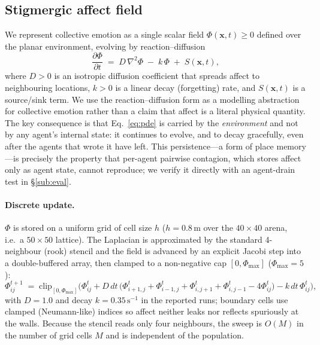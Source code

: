 \documentclass[sigconf,nonacm]{acmart}
\begin{document}
\subsection{Stigmergic affect field}
\label{sub:field}
We represent collective emotion as a single scalar field $\Phi(\mathbf{x},t)\ge 0$ defined over the planar environment, evolving by reaction--diffusion
\begin{equation}
\frac{\partial \Phi}{\partial t} \;=\; D\,\nabla^2\Phi \;-\; k\,\Phi \;+\; S(\mathbf{x},t),
\label{eq:pde}
\end{equation}
where $D>0$ is an isotropic diffusion coefficient that spreads affect to neighbouring locations, $k>0$ is a linear decay (forgetting) rate, and $S(\mathbf{x},t)$ is a source/sink term. We use the reaction--diffusion form as a modelling abstraction for collective emotion rather than a claim that affect is a literal physical quantity. The key consequence is that Eq.~\eqref{eq:pde} is carried by the \emph{environment} and not by any agent's internal state: it continues to evolve, and to decay gracefully, even after the agents that wrote it have left. This persistence---a form of place memory---is precisely the property that per-agent pairwise contagion, which stores affect only as agent state, cannot reproduce; we verify it directly with an agent-drain test in \S\ref{sub:eval}.

\paragraph{Discrete update.} $\Phi$ is stored on a uniform grid of cell size $h$ ($h=0.8$\,m over the $40\times40$ arena, i.e.\ a $50\times50$ lattice). The Laplacian is approximated by the standard 4-neighbour (rook) stencil and the field is advanced by an explicit Jacobi step into a double-buffered array, then clamped to a non-negative cap $[0,\Phi_{\max}]$ ($\Phi_{\max}=5$):
\begin{equation}
\Phi^{t+1}_{ij} \;=\; \mathrm{clip}_{[0,\Phi_{\max}]}\!\Big(\Phi^{t}_{ij} + D\,dt\,\big(\Phi^{t}_{i+1,j}+\Phi^{t}_{i-1,j}+\Phi^{t}_{i,j+1}+\Phi^{t}_{i,j-1}-4\Phi^{t}_{ij}\big) - k\,dt\,\Phi^{t}_{ij}\Big),
\label{eq:jacobi}
\end{equation}
with $D=1.0$ and decay $k=0.35\,\mathrm{s}^{-1}$ in the reported runs; boundary cells use clamped (Neumann-like) indices so affect neither leaks nor reflects spuriously at the walls. Because the stencil reads only four neighbours, the sweep is $O(M)$ in the number of grid cells $M$ and is independent of the population.
\end{document}
